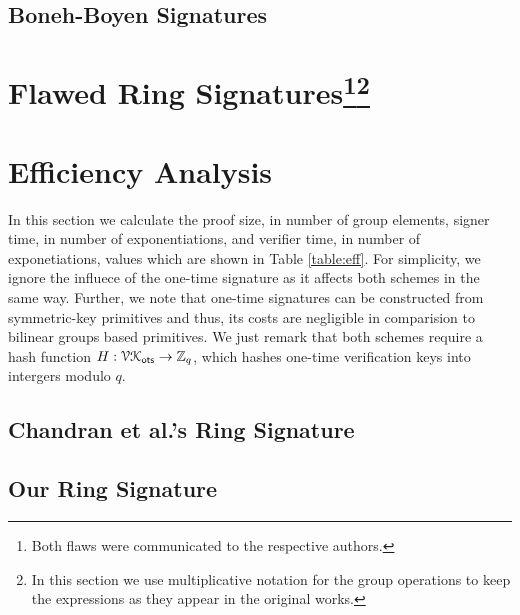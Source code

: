\documentclass[a4paper,english]{lipics-v2016}
\begin{document}
		

	\subsection{Boneh-Boyen Signatures} \label{sec:bbs}
    
            

	 \section{Flawed Ring Signatures\protect\footnote{Both flaws were communicated to the respective authors.}\protect\footnote{In this section we use multiplicative notation for the group operations to keep the expressions as they appear in the original works.}}\label{sec:rs-flawed}
    
        	 

	\section{Efficiency Analysis}
		In this section we calculate the proof size, in number of group elements, signer time, in number of exponentiations, and verifier time, in number of exponetiations, values which are shown in Table \ref{table:eff}. For simplicity, we ignore the influece of the one-time signature as it affects both schemes in the same way. Further, we note that one-time signatures can be constructed from symmetric-key primitives and thus, its costs are negligible in comparision to bilinear groups based primitives. We just remark that both schemes require a hash function $H:\mathcal{VK}_{\mathsf{ots}}\to\mathbb{Z}_q$, which hashes one-time verification keys into intergers modulo $q$.
		\subsection{Chandran et al.'s Ring Signature}
			
		\subsection{Our Ring Signature}
			
\end{document}
